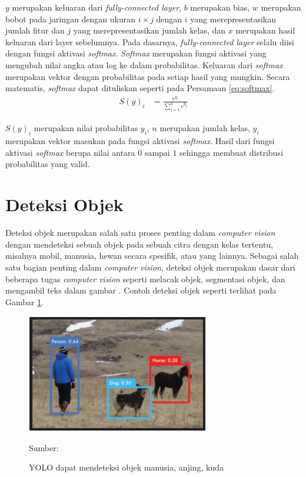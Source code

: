     $y$ merupakan keluaran dari \textit{fully-connected layer}, $b$ merupakan bias, $w$ merupakan bobot pada jaringan dengan ukuran $i\times j$ dengan $i$ yang merepresentasikan jumlah fitur dan $j$ yang merepresentasikan jumlah kelas, dan $x$ merupakan hasil keluaran dari layer sebelumnya.
	Pada dasarnya, \textit{fully-connected layer} selalu diisi dengan fungsi aktivasi \textit{softmax}. \textit{Softmax} merupakan fungsi aktivasi yang mengubah nilai angka atau log ke dalam probabilitas. Keluaran dari \textit{softmax} merupakan vektor dengan probabilitas pada setiap hasil yang mungkin. Secara matematis, \textit{softmax} dapat dituliskan seperti pada Persamaan \ref{eq:softmax}.
    \begin{align}
        S(y)_i &= \frac{e^{y_i}}{\sum_{j=1}^{n} e^{y_j}} 
        \label{eq:softmax}
    \end{align}

    $S(y)_i$ merupakan nilai probabilitas $y_i$, $n$ merupakan jumlah kelas, $y_i$ merupakan vektor masukan pada fungsi aktivasi \textit{softmax}. Hasil dari fungsi aktivasi \textit{softmax} berupa nilai antara $0$ sampai $1$ sehingga membuat distribusi probabilitas yang valid.

\section{Deteksi Objek}
Deteksi objek merupakan salah satu proses penting dalam \textit{computer vision} dengan mendeteksi sebuah objek pada sebuah citra dengan kelas tertentu, misalnya mobil, manusia, hewan secara spesifik, atau yang lainnya. Sebagai salah satu bagian penting dalam \textit{computer vision}, deteksi objek merupakan dasar dari beberapa tugas \textit{computer vision} seperti melacak objek, segmentasi objek, dan mengambil teks dalam gambar \citep{Zou2019}. Contoh deteksi objek seperti terlihat pada Gambar \ref{fig:obj-det}.

\begin{figure}[H]
    \begin{center}
        \includegraphics[width=8cm]{../img/Object Detection - Latex.png}
        \caption{YOLO dapat mendeteksi objek manusia, anjing, kuda}
        \label{fig:obj-det}
        Sumber: \citep{Redmon2016a}
    \end{center}
\end{figure}

